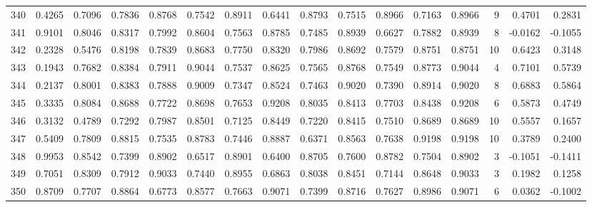 \begin{tabular}{lrrrrrrrrrrrrrrr}
340 &      0.4265 &  0.7096 &  0.7836 &  0.8768 &  0.7542 &  0.8911 &  0.6441 &  0.8793 &  0.7515 &  0.8966 &   0.7163 &     0.8966 &      9 &                    0.4701 &                     0.2831 \\
341 &      0.9101 &  0.8046 &  0.8317 &  0.7992 &  0.8604 &  0.7563 &  0.8785 &  0.7485 &  0.8939 &  0.6627 &   0.7882 &     0.8939 &      8 &                   -0.0162 &                    -0.1055 \\
342 &      0.2328 &  0.5476 &  0.8198 &  0.7839 &  0.8683 &  0.7750 &  0.8320 &  0.7986 &  0.8692 &  0.7579 &   0.8751 &     0.8751 &     10 &                    0.6423 &                     0.3148 \\
343 &      0.1943 &  0.7682 &  0.8384 &  0.7911 &  0.9044 &  0.7537 &  0.8625 &  0.7565 &  0.8768 &  0.7549 &   0.8773 &     0.9044 &      4 &                    0.7101 &                     0.5739 \\
344 &      0.2137 &  0.8001 &  0.8383 &  0.7888 &  0.9009 &  0.7347 &  0.8524 &  0.7463 &  0.9020 &  0.7390 &   0.8914 &     0.9020 &      8 &                    0.6883 &                     0.5864 \\
345 &      0.3335 &  0.8084 &  0.8688 &  0.7722 &  0.8698 &  0.7653 &  0.9208 &  0.8035 &  0.8413 &  0.7703 &   0.8438 &     0.9208 &      6 &                    0.5873 &                     0.4749 \\
346 &      0.3132 &  0.4789 &  0.7292 &  0.7987 &  0.8501 &  0.7125 &  0.8449 &  0.7220 &  0.8415 &  0.7510 &   0.8689 &     0.8689 &     10 &                    0.5557 &                     0.1657 \\
347 &      0.5409 &  0.7809 &  0.8815 &  0.7535 &  0.8783 &  0.7446 &  0.8887 &  0.6371 &  0.8563 &  0.7638 &   0.9198 &     0.9198 &     10 &                    0.3789 &                     0.2400 \\
348 &      0.9953 &  0.8542 &  0.7399 &  0.8902 &  0.6517 &  0.8901 &  0.6400 &  0.8705 &  0.7600 &  0.8782 &   0.7504 &     0.8902 &      3 &                   -0.1051 &                    -0.1411 \\
349 &      0.7051 &  0.8309 &  0.7912 &  0.9033 &  0.7440 &  0.8955 &  0.6863 &  0.8038 &  0.8451 &  0.7144 &   0.8648 &     0.9033 &      3 &                    0.1982 &                     0.1258 \\
350 &      0.8709 &  0.7707 &  0.8864 &  0.6773 &  0.8577 &  0.7663 &  0.9071 &  0.7399 &  0.8716 &  0.7627 &   0.8986 &     0.9071 &      6 &                    0.0362 &                    -0.1002 \\

\end{tabular}
